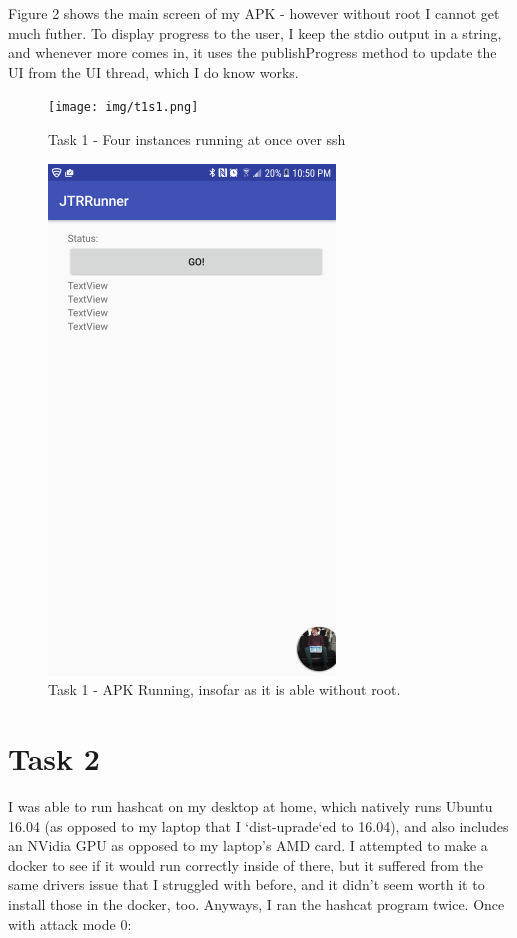 \documentclass{article}
\begin{document}
Figure 2 shows the main screen of my APK - however without root I cannot get much futher. To display progress to the user, I keep the stdio output in a string, and whenever more comes in, it uses the publishProgress method to update the UI from the UI thread, which I do know works.

	\begin{figure}[ht]
        \centerline{
            \texttt{[image: img/t1s1.png]}
        }
		\centering
		\caption{Task 1 - Four instances running at once over ssh}
	\end{figure}
	\begin{figure}[ht]
        \centerline{
            \includegraphics[width=3in]{img/t1s2.png}
        }
		\centering
		\caption{Task 1 - APK Running, insofar as it is able without root.}
	\end{figure}


\clearpage

\section{Task 2}
I was able to run hashcat on my desktop at home, which natively runs Ubuntu 16.04 (as opposed to my laptop that I `dist-uprade`ed to 16.04), and also includes an NVidia GPU as opposed to my laptop's AMD card.
I attempted to make a docker to see if it would run correctly inside of there, but it suffered from the same drivers issue that I struggled with before, and it didn't seem worth it to install those in the docker, too.
Anyways, I ran the hashcat program twice. Once with attack mode 0:
\end{document}
